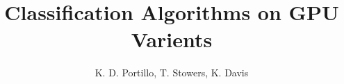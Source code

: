\documentclass{IEEEtran}
\begin{document}
 
\title{Classification Algorithms on GPU Varients}
\author{K. D. Portillo, T. Stowers, K. Davis}
\maketitle





\end{document}
